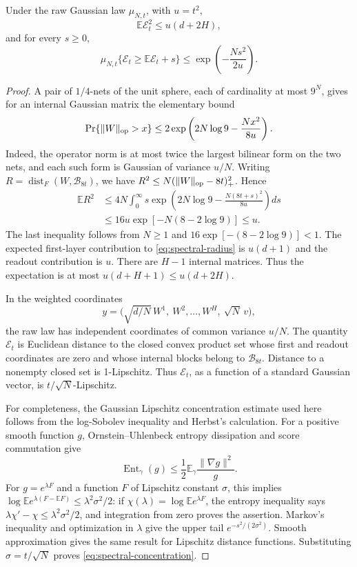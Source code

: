 \begin{lemma}
\label{lem:spectral-excess}
Under the raw Gaussian law $\mu_{N,t}$, with $u=t^2$,
\[
 \mathbb E\mathcal E_t^2\le u(d+2H),
\]
and for every $s\ge0$,
\begin{equation}\label{eq:spectral-concentration}
 \mu_{N,t}\{\mathcal E_t\ge\mathbb E\mathcal E_t+s\}
       \le\exp\left(-\frac{Ns^2}{2u}\right).
\end{equation}
\end{lemma}
\begin{proof}
A pair of $1/4$-nets of the unit sphere, each of cardinality at most
$9^N$, gives for an internal Gaussian matrix the elementary bound
\[
 \Pr\{\|W\|_{\rm op}>x\}
 \le2\exp\left(2N\log9-\frac{Nx^2}{8u}\right).
\]
Indeed, the operator norm is at most twice the largest bilinear form
on the two nets, and each such form is Gaussian of variance $u/N$.
Writing $R=\operatorname{dist}_F(W,\mathcal B_{8t})$, we have
$R^2\le N(\|W\|_{\rm op}-8t)_+^2$. Hence
\begin{align*}
 \mathbb E R^2
 &\le 4N\int_0^\infty s
       \exp\left(2N\log9-
                   \frac{N(8t+s)^2}{8u}\right)ds\\
 &\le 16u\exp[-N(8-2\log9)]\le u.
\end{align*}
The last inequality follows from $N\ge1$ and
$16\exp[-(8-2\log9)]<1$.
The expected first-layer contribution to \eqref{eq:spectral-radius}
is $u(d+1)$ and the readout contribution is $u$.
There are $H-1$ internal matrices. Thus the expectation is at most
$u(d+H+1)\le u(d+2H)$.

In the weighted coordinates
\[
 y=\bigl(\sqrt{d/N}\,W^1,\ W^2,\ldots,W^H,\ \sqrt N\,v\bigr),
\]
the raw law has independent coordinates of common variance $u/N$.
The quantity $\mathcal E_t$ is Euclidean distance to the closed convex
product set whose first and readout coordinates are zero and whose
internal blocks belong to $\mathcal B_{8t}$. Distance to a nonempty
closed set is 1-Lipschitz. Thus $\mathcal E_t$, as a function of a
standard Gaussian vector, is $t/\sqrt N$-Lipschitz.

For completeness, the Gaussian Lipschitz concentration estimate used
here follows from the log-Sobolev inequality and Herbst's calculation.
For a positive smooth function $g$, Ornstein--Uhlenbeck entropy
dissipation and score commutation give
\[
 \operatorname{Ent}_{\gamma}(g)
 \le\frac12\mathbb E_\gamma\frac{\|\nabla g\|^2}{g}.
\]
For $g=e^{\lambda F}$ and a function $F$ of Lipschitz constant $\sigma$,
this implies
$\log\mathbb E e^{\lambda(F-\mathbb EF)}\le\lambda^2\sigma^2/2$:
if $\chi(\lambda)=\log\mathbb Ee^{\lambda F}$, the entropy inequality
says $\lambda\chi'-\chi\le\lambda^2\sigma^2/2$, and integration
from zero proves the assertion. Markov's inequality and optimization in
$\lambda$ give the upper tail $e^{-s^2/(2\sigma^2)}$.
Smooth approximation gives the same result for Lipschitz distance
functions. Substituting $\sigma=t/\sqrt N$ proves
\eqref{eq:spectral-concentration}.
\end{proof}

